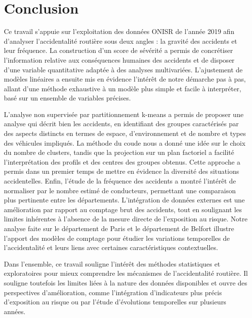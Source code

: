 \documentclass[11pt,a4paper]{article}
\begin{document}
\section{Conclusion}

Ce travail s’appuie sur l’exploitation des données ONISR de l’année 2019 afin d’analyser l’accidentalité
routière sous deux angles : la gravité des accidents et leur fréquence. La construction
d’un score de sévérité a permis de concrétiser l’information relative aux conséquences humaines des
accidents et de disposer d’une variable quantitative adaptée à des analyses multivariées. L’ajustement
de modèles linéaires a ensuite mis en évidence l’intérêt de notre démarche pas à pas, allant d’une
méthode exhaustive à un modèle plus simple et facile à interpréter, basé sur un ensemble
de variables précises.

L’analyse non supervisée par partitionnement k-means a permis de proposer une analyse qui décrit bien les accidents, en identifiant des groupes caractérisés par des aspects distincts en termes de
espace, d’environnement et de nombre et types des véhicules impliqués. La méthode du coude nous a donné une idée sur le choix du nombre de clusters, tandis que la projection sur un plan factoriel a
facilité l’interprétation des profils et des centres des groupes obtenus. Cette approche a permis dans un premier temps de mettre en évidence
la diversité des situations accidentelles.
Enfin, l’étude de la fréquence des accidents a montré l’intérêt de normaliser par le nombre estimé
de conducteurs, permettant une comparaison plus pertinente entre les départements. L’intégration de
données externes est une amélioration par rapport au comptage brut des accidents, tout en soulignant les limites inhérentes à l’absence de la mesure
directe de l’exposition au risque. Notre analyse faite sur le département de Paris et le département de Belfort illustre
l’apport des modèles de comptage pour étudier les variations temporelles de l’accidentalité et leurs
liens avec certaines caractéristiques contextuelles.

Dans l’ensemble, ce travail souligne l’intérêt des méthodes statistiques et exploratoires pour
mieux comprendre les mécanismes de l’accidentalité routière. Il souligne toutefois les limites liées à la nature des données disponibles et ouvre des perspectives d’amélioration, comme l’intégration d’indicateurs plus précis d’exposition au risque ou par l’étude d’évolutions temporelles sur plusieurs
années.




\end{document}
